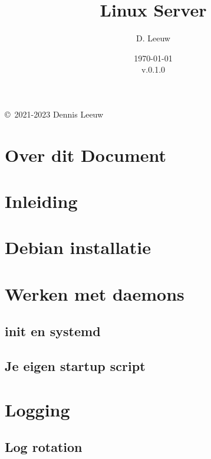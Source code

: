 \documentclass[a4paper,12pt,twoside,openright,titlepage]{book}
\author{D. Leeuw}
\title{Linux Server}
\date{\today\\v.0.1.0}
\begin{document}

\maketitle

\copyright\ 2021-2023 Dennis Leeuw\\




\frontmatter
\chapter{Over dit Document}



\tableofcontents

\mainmatter
\chapter{Inleiding}


\chapter{Debian installatie}


\chapter{Werken met daemons}

\section{init en systemd}

\section{Je eigen startup script}


\chapter{Logging}

\section{Log rotation}\label{sec:logrotate}

\end{document}
